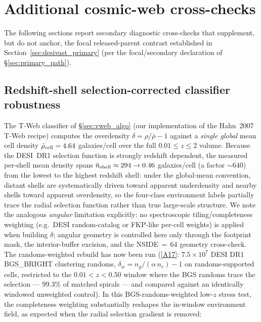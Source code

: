 \documentclass[twocolumn,linenumbers]{aastex702}
\newcommand{\repoBase}{https://github.com/Hubify-Projects/bigbounce/blob/main}
\begin{document}
\section{Additional cosmic-web cross-checks}\label{sec:additional_cw}

The following sections report secondary diagnostic cross-checks
that supplement, but do not anchor, the focal released-parent
contrast established in
Section~\ref{sec:desivast_primary} (per the focal/secondary
declaration of \S\ref{sec:primary_path}).

\subsection{Redshift-shell selection-corrected classifier
robustness}\label{sec:zshell_robustness}

The T-Web classifier of \S\ref{sec:vweb_algo} (our implementation of
the Hahn~2007 T-Web recipe) computes the overdensity
$\delta = \rho/\bar\rho - 1$ against a \emph{single global} mean cell
density $\bar\rho_{\rm cell} = 4.64$ galaxies/cell over the full
$0.01 \le z \le 2$ volume. Because the DESI~DR1 selection function is
strongly redshift dependent, the measured per-shell mean density spans
$\bar n_{\rm shell} \approx 294 \to 0.46$ galaxies/cell (a factor
${\sim}640$) from the lowest to the highest redshift shell: under the
global-mean convention, distant shells are systematically driven toward
apparent underdensity and nearby shells toward apparent overdensity, so
the four-class environment labels partially trace the radial selection
function rather than true large-scale structure. We note the analogous
\emph{angular} limitation explicitly: no spectroscopic
tiling/completeness weighting (e.g.\ DESI random-catalog or FKP-like
per-cell weights) is applied when building $\delta$; angular geometry
is controlled here only through the footprint mask, the interior-buffer
excision, and the NSIDE$\,=\,$64 geometry cross-check. The
randoms-weighted rebuild has now been run
(\href{\repoBase/pipelines/p5\_desi\_chirality/outputs/25\_completeness\_weighted\_rebuild.json}{[A17]}:
$7.5\times 10^7$ DESI DR1 BGS\_BRIGHT clustering randoms,
$\delta_w = n_g/(\alpha\,n_r) - 1$ on randoms-supported cells, restricted
to the $0.01 < z < 0.50$ window where the BGS randoms trace the
selection --- $99.3\%$ of matched spirals --- and compared against an
identically windowed unweighted control). In this BGS-randoms-weighted low-$z$ stress test, the completeness weighting substantially reshapes the in-window environment field, as expected when the radial selection gradient is removed:
\end{document}
